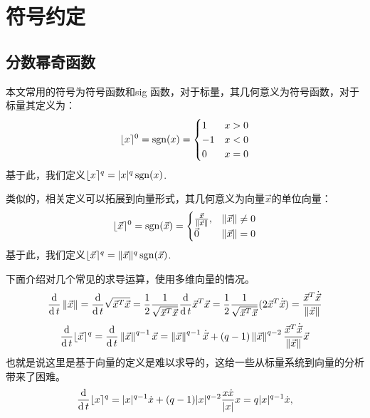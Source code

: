 \section{符号约定}

\subsection{分数幂奇函数}
本文常用的符号为符号函数和sig 函数，对于标量，其几何意义为符号函数，对于标量其定义为：
\begin{equation}
    \lfloor x \rceil^0=\mathop{\mathrm{sgn}} (x)=\begin{cases}
    	1   & x>0\\
    	-1 & x<0\\
    	0  & x=0\\
    \end{cases}
\end{equation}
基于此，我们定义$\lfloor x \rceil^q=|x|^q \mathop{\mathrm{sgn}} (x)$.

类似的，相关定义可以拓展到向量形式，其几何意义为向量$\vec{x}$的单位向量：
\begin{equation}
	\lfloor \vec{x} \rceil^0=\mathop{\mathrm{sgn}} (\vec{x})=\begin{cases}
		\frac{\vec{x}}{\left\lVert\vec{x}\right\rVert}, & \left\lVert\vec{x}\right\rVert\neq 0\\
		\vec{0}   & \left\lVert\vec{x}\right\rVert=0
	\end{cases}
\end{equation}
基于此，我们定义$\lfloor \vec{x} \rceil^q=\|\vec{x}\|^q \mathop{\mathrm{sgn}} (\vec{x})$.

下面介绍对几个常见的求导运算，使用多维向量的情况。
\begin{equation}
	\frac{\operatorname{d}}{\operatorname{d} t} \left\lVert\vec{x}\right\rVert
	= \frac{\operatorname{d}}{\operatorname{d} t} \sqrt{\vec{x}^T\vec{x}}
	= \frac12 \frac{1}{\sqrt{\vec{x}^T\vec{x}}}\frac{\operatorname{d}}{\operatorname{d} t} {\vec{x}^T\vec{x}}
	= \frac12 \frac{1}{\sqrt{\vec{x}^T\vec{x}}} (2 \vec{x}^T \dot{\vec{x}})
	= \frac{\vec{x}^T\dot{\vec{x}}}{\left\lVert\vec{x}\right\rVert}
\end{equation}
\begin{equation}
	\frac{\operatorname{d}}{\operatorname{d} t} \lfloor \vec{x} \rceil^q
	=\frac{\operatorname{d}}{\operatorname{d} t} \left\lVert\vec{x}\right\rVert^{q-1} \vec{x}
	=\left\lVert\vec{x}\right\rVert^{q-1} \dot{\vec{x}}+(q-1) \left\lVert\vec{x}\right\rVert^{q-2}  \frac{\vec{x}^T\dot{\vec{x}}}{\left\lVert\vec{x}\right\rVert}\vec{x}
\end{equation}
也就是说这里是基于向量的定义是难以求导的，这给一些从标量系统到向量的分析带来了困难。
\begin{equation}
	\frac{\operatorname{d}}{\operatorname{d} t} \lfloor x \rceil^q
	=|x|^{q-1} \dot{x}+(q-1) |x|^{q-2}  \frac{x \dot{x}}{|x|}x
	=q|x|^{q-1}\dot{x},
\end{equation}


